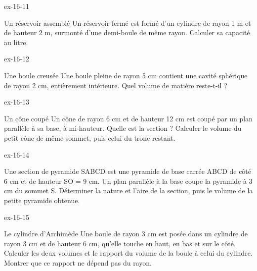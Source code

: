 \clearpage{}
\begin{blocLivre}{ex-16-11}\begin{exercice}[3]{Un réservoir assemblé}
Un réservoir fermé est formé d’un cylindre de rayon 1 m et de hauteur 2 m, surmonté d’une demi-boule de même rayon. Calculer sa capacité au litre.
\label{fig-ex-16-11}
\end{exercice}\end{blocLivre}
\begin{blocLivre}{ex-16-12}\begin{exercice}[3]{Une boule creusée}
Une boule pleine de rayon 5 cm contient une cavité sphérique de rayon 2 cm, entièrement intérieure. Quel volume de matière reste-t-il ?
\label{fig-ex-16-12}
\end{exercice}\end{blocLivre}
\begin{blocLivre}{ex-16-13}\begin{exercice}[3]{Un cône coupé}
Un cône de rayon 6 cm et de hauteur 12 cm est coupé par un plan parallèle à sa base, à mi-hauteur. Quelle est la section ? Calculer le volume du petit cône de même sommet, puis celui du tronc restant.
\label{fig-ex-16-13}
\end{exercice}\end{blocLivre}
\begin{blocLivre}{ex-16-14}\begin{exercice}[3]{Une section de pyramide}
SABCD est une pyramide de base carrée ABCD de côté 6 cm et de hauteur SO = 9 cm. Un plan parallèle à la base coupe la pyramide à 3 cm du sommet S. Déterminer la nature et l’aire de la section, puis le volume de la petite pyramide obtenue.
\label{fig-ex-16-14}
\end{exercice}\end{blocLivre}
\begin{blocLivre}{ex-16-15}\begin{exercice}[3]{Le cylindre d’Archimède}
Une boule de rayon 3 cm est posée dans un cylindre de rayon 3 cm et de hauteur 6 cm, qu’elle touche en haut, en bas et sur le côté. Calculer les deux volumes et le rapport du volume de la boule à celui du cylindre. Montrer que ce rapport ne dépend pas du rayon.
\label{fig-ex-16-15}
\end{exercice}\end{blocLivre}

\clearpage
